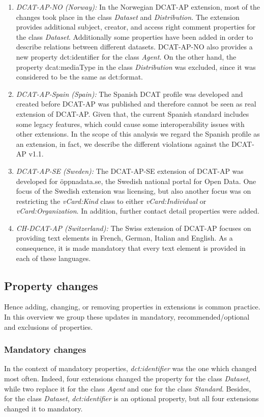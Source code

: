 \documentclass[<options>]{elsarticle}
\begin{document}
\begin{enumerate}
\item \textit{DCAT-AP-NO (Norway):} In the Norwegian DCAT-AP extension, most of the changes took place in the class \textit{Dataset} and \textit{Distribution}. The extension provides additional subject, creator, and access right comment properties for the class \textit{Dataset}. Additionally some properties have been added in order to describe relations between different datasets. DCAT-AP-NO also provides a new property dct:identifier for the class \textit{Agent}. On the other hand, the property dcat:mediaType in the class \textit{Distribution} was excluded, since it was considered to be the same as dct:format. 

\item \textit{DCAT-AP-Spain (Spain):} The Spanish DCAT profile was developed and created before DCAT-AP was published and therefore cannot be seen as real extension of DCAT-AP. Given that, the current Spanish standard includes some legacy features, which could cause some interoperability issues with other extensions. In the scope of this analysis we regard the Spanish profile as an extension, in fact, we describe the different violations against the DCAT-AP v1.1.

\item \textit{DCAT-AP-SE (Sweden):} The DCAT-AP-SE extension of DCAT-AP was developed for öppnadata.se, the Swedish national portal for Open Data. One focus of the Swedish extension was licensing, but also another focus was on restricting the \textit{vCard:Kind }class to either \textit{vCard:Individual} or \textit{vCard:Organization}. In addition, further contact detail properties were added. 

\item \textit{CH-DCAT-AP (Switzerland):} The Swiss extension of DCAT-AP focuses on providing text elements in French, German, Italian and English. As a consequence, it is made mandatory that every text element is provided in each of these languages. 
\end{enumerate}

\subsection{Property changes}
Hence adding, changing, or removing properties in extensions is common practice. In this overview we group these updates in mandatory, recommended/optional and exclusions of properties. 

\subsubsection{Mandatory changes}
In the context of mandatory properties, \textit{dct:identifier} was the one which changed most often. Indeed, four extensions changed the property for the class \textit{Dataset}, while two replace it for the class \textit{Agent} and one for the class \textit{Standard}. Besides, for the class \textit{Dataset}, \textit{dct:identifier} is an optional property, but all four extensions changed it to mandatory.
\end{document}
